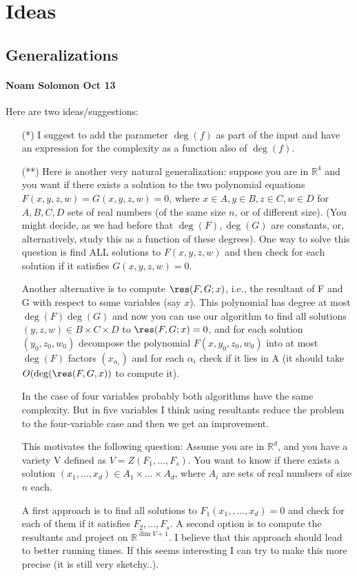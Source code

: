 \section{Ideas}

\subsection{Generalizations}
\paragraph{Noam Solomon Oct 13}
Here are two ideas/suggestions:
\begin{itemize}
	\item[(*)] I suggest to add the parameter $\deg(f)$ as part of the input and have an
expression for the complexity as a function also of $\deg(f)$.

	\item[(**)] Here is another very natural generalization: suppose you are in
		$\mathbb{R}^4$
and you want if there exists a solution to the two polynomial equations
$F(x,y,z,w)=G(x,y,z,w)=0$, where $x \in A, y\in B, z\in C, w \in D$ for $A,B,C,D$
sets of real numbers (of the same size $n$, or of different size).
(You might decide, as we had before that $\deg(F), \deg(G)$ are constants,
or, alternatively, study this as a function of these degrees).
One way to solve this question is find ALL solutions to $F(x,y,z,w)$ and then
check for each solution if it satisfies $G(x,y,z,w)=0$.

Another alternative is to compute $\res(F,G; x)$, i.e., the resultant of F and
G with respect to some variables (say $x$). This polynomial has degree at
most $\deg(F)\deg(G)$ and now you can use our algorithm to find all solutions
$(y,z,w) \in B\times C \times D$ to $\res(F,G;x)=0$, and for each solution $(y_0,
z_0, w_0)$ decompose the polynomial $F(x,y_0,z_0,w_0)$ into at most $\deg(F)$
factors $(x_{\alpha_i})$ and for each $\alpha_i$  check if it lies in A (it
should take $O(\deg(\res(F,G,x))$ to compute it).

In the case of four variables probably both algorithms have the same
complexity. But in five variables I think using resultants reduce the
problem to the four-variable case and then we get an improvement.

This motivates the following question: Assume you are in $\mathbb{R}^d$, and you have
a variety V defined as $V=Z(F_1,\ldots, F_s)$. You want to know if there
exists a solution $(x_1,...,x_d)\in A_1 \times \ldots \times
A_d$, where $A_i$
are sets of real numbers of size $n$ each.

A first approach is to find all solutions to $F_1(x_1,,\ldots, x_d)=0$ and
check for each of them if it satisfies $F_2,\ldots, F_s$.
A second option is to compute the resultants and project on $\mathbb{R}^{\dim V + 1}$.
I believe that this approach should lead to better running times. If this
seems interesting I can try to make this more precise (it is still very
sketchy..).
\end{itemize}

